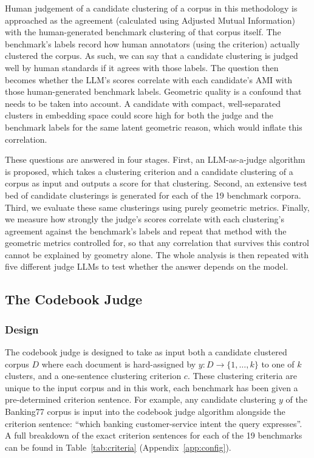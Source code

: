 \documentclass[11pt,a4paper,oneside]{report}
\begin{document}
Human judgement of a candidate clustering of a corpus in this methodology is approached as the agreement (calculated using Adjusted Mutual Information) with the human-generated benchmark clustering of that corpus itself. The benchmark's labels record how human annotators (using the criterion) actually clustered the corpus. As such, we can say that a candidate clustering is judged well by human standards if it agrees with those labels. The question then becomes whether the LLM's scores correlate with each candidate's AMI with those human-generated benchmark labels. Geometric quality is a confound that needs to be taken into account. A candidate with compact, well-separated clusters in embedding space could score high for both the judge and the benchmark labels for the same latent geometric reason, which would inflate this correlation.

These questions are answered in four stages. First, an LLM-as-a-judge algorithm is proposed, which takes a clustering criterion and a candidate clustering of a corpus as input and outputs a score for that clustering. Second, an extensive test bed of candidate clusterings is generated for each of the 19 benchmark corpora. Third, we evaluate these same clusterings using purely geometric metrics. Finally, we measure how strongly the judge's scores correlate with each clustering's agreement against the benchmark's labels and repeat that method with the geometric metrics controlled for, so that any correlation that survives this control cannot be explained by geometry alone. The whole analysis is then repeated with five different judge LLMs to test whether the answer depends on the model.

\subsection{The Codebook Judge}\label{sec:CODEBOOKJUDGE}

\subsubsection{Design}

The codebook judge is designed to take as input both a candidate clustered corpus $D$ where each document is hard-assigned by $y : D \to \{1,\dots,k\}$ to one of $k$ clusters, and a one-sentence clustering criterion $c$. These clustering criteria are unique to the input corpus and in this work, each benchmark has been given a pre-determined criterion sentence. For example, any candidate clustering $y$ of the Banking77 corpus is input into the codebook judge algorithm alongside the criterion sentence: ``which banking customer-service intent the query expresses''. A full breakdown of the exact criterion sentences for each of the 19 benchmarks can be found in Table~\ref{tab:criteria} (Appendix~\ref{app:config}).
\end{document}
